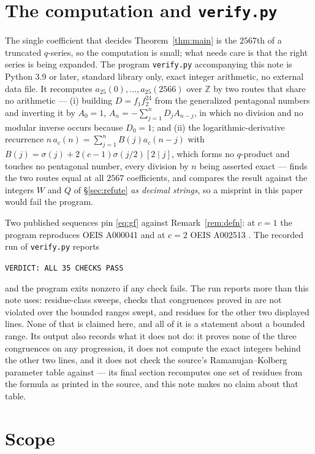 \documentclass[11pt]{amsart}
\theoremstyle{remark}
\begin{document}
\section{The computation and \texttt{verify.py}}\label{sec:verify}

The single coefficient that decides Theorem~\ref{thm:main} is the $2567$th of a
truncated $q$-series, so the computation is small; what needs care is that the
right series is being expanded. The program \texttt{verify.py} accompanying this
note is Python 3.9 or later, standard library only, exact integer arithmetic, no
external data file. It recomputes $a_{25}(0),\dots,a_{25}(2566)$ over
$\mathbb{Z}$ by two routes that share no arithmetic ---
(i) building $D=f_1f_2^{24}$ from the generalized pentagonal numbers and
inverting it by $A_0=1$, $A_n=-\sum_{j=1}^{n}D_jA_{n-j}$, in which no division
and no modular inverse occurs because $D_0=1$; and
(ii) the logarithmic-derivative recurrence
$n\,a_c(n)=\sum_{j=1}^{n}B(j)a_c(n-j)$ with
$B(j)=\sigma(j)+2(c-1)\sigma(j/2)[2\mid j]$, which forms no $q$-product and
touches no pentagonal number, every division by $n$ being asserted exact ---
finds the two routes equal at all $2567$ coefficients, and compares the result
against the integers $W$ and $Q$ of \S\ref{sec:refute} \emph{as decimal
strings}, so a misprint in this paper would fail the program.

Two published sequences pin \eqref{eq:gf} against Remark~\ref{rem:defn}: at
$c=1$ the program reproduces OEIS A000041 and at $c=2$ OEIS A002513
\cite{OEIS}. The recorded run of \texttt{verify.py} reports
\begin{center}
\texttt{VERDICT: ALL 35 CHECKS PASS}
\end{center}
and the program exits nonzero if any check fails. The run reports more than this
note uses: residue-class sweeps, checks that congruences proved in
\cite{DasMaitySaikia} are not violated over the bounded ranges swept, and
residues for the other two displayed lines. None of that is claimed here, and
all of it is a statement about a bounded range. Its output also records what it
does not do: it proves none of the three congruences on any progression, it does
not compute the exact integers behind the other two lines, and it does not check
the source's Ramanujan--Kolberg parameter table against \cite{Radu} --- its final
section recomputes one set of residues from the formula as printed in the source,
and this note makes no claim about that table.

\section{Scope}\label{sec:scope}
\end{document}
